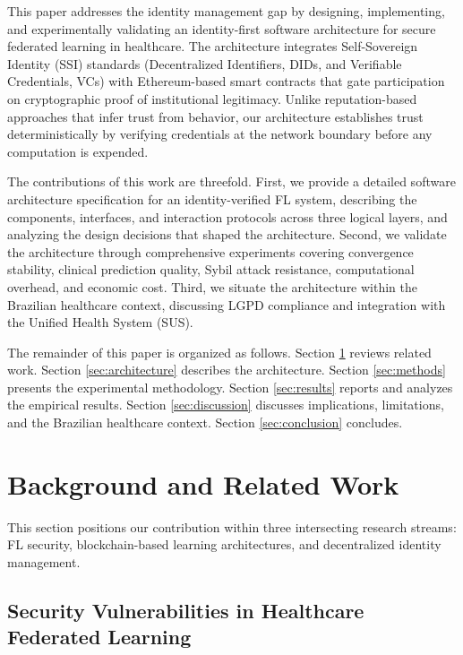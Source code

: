 \documentclass[english]{sbc2025}
\begin{document}
This paper addresses the identity management gap by designing, implementing, and experimentally validating an identity-first software architecture for secure federated learning in healthcare. The architecture integrates Self-Sovereign Identity (SSI) standards (Decentralized Identifiers, DIDs, and Verifiable Credentials, VCs) \citep{W3C_DID_2022,W3C2019} with Ethereum-based smart contracts that gate participation on cryptographic proof of institutional legitimacy. Unlike reputation-based approaches that infer trust from behavior, our architecture establishes trust deterministically by verifying credentials at the network boundary before any computation is expended.

The contributions of this work are threefold. First, we provide a detailed software architecture specification for an identity-verified FL system, describing the components, interfaces, and interaction protocols across three logical layers, and analyzing the design decisions that shaped the architecture. Second, we validate the architecture through comprehensive experiments covering convergence stability, clinical prediction quality, Sybil attack resistance, computational overhead, and economic cost. Third, we situate the architecture within the Brazilian healthcare context, discussing LGPD compliance and integration with the Unified Health System (SUS).

The remainder of this paper is organized as follows. Section \ref{sec:background} reviews related work. Section \ref{sec:architecture} describes the architecture. Section \ref{sec:methods} presents the experimental methodology. Section \ref{sec:results} reports and analyzes the empirical results. Section \ref{sec:discussion} discusses implications, limitations, and the Brazilian healthcare context. Section \ref{sec:conclusion} concludes.


\section{Background and Related Work}
\label{sec:background}

This section positions our contribution within three intersecting research streams: FL security, blockchain-based learning architectures, and decentralized identity management.

\subsection{Security Vulnerabilities in Healthcare Federated Learning}
\end{document}
